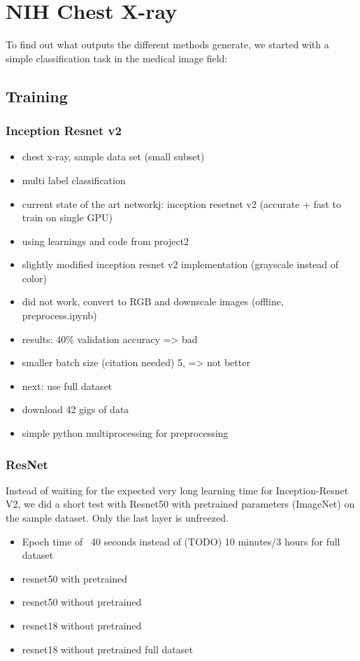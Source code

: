 \chapter{NIH Chest X-ray}
To find out what outputs the different methods generate, we started with a simple classification task in the medical image field:

\section{Training}
\subsection{Inception Resnet v2}
\begin{itemize}
    \item  chest x-ray, sample data set (small subset)
    \item  multi label classification
    \item  current state of the art networkj: inception  resetnet v2 (accurate + fast to train on single GPU) \cite{todo}
    \item  using learnings and code from project2
    \item  slightly modified inception resnet v2 implementation (grayscale instead of color)
    \item  did not work, convert to RGB and downscale images (offline, preprocess.ipynb)
    \item  results: 40\% validation accuracy => bad
    \item smaller batch size (citation needed) 5, => not better
    \item next: use full dataset
    \item download 42 gigs of data
    \item simple python multiprocessing for preprocessing
\end{itemize}

\subsection{ResNet}
Instead of waiting for the expected very long learning time for Inception-Resnet V2, we did a short test with Resnet50 with pretrained parameters (ImageNet) on the sample dataset. Only the last layer is unfreezed.

\begin{itemize}
    \item Epoch time of ~40 seconds instead of (TODO) 10 minutes/3 hours for full dataset
    \item resnet50 with pretrained
    \item resnet50 without pretrained
    \item resnet18 without pretrained
    \item resnet18 without pretrained full dataset
\end{itemize}

